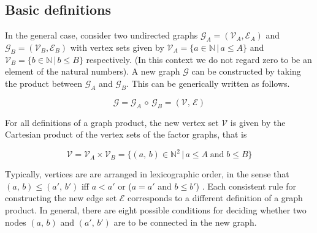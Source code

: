 \subsection{Basic definitions}

\label{sec:graph_products_defined}

In the general case, consider two undirected graphs $\mathcal{G}_A = (\mathcal{V}_A, \mathcal{E}_A)$ and $\mathcal{G}_B = (\mathcal{V}_B, \mathcal{E}_B)$ with vertex sets given by $\mathcal{V}_A = \{a \in \mathbb{N} \, | \, a \leq A \}$ and $\mathcal{V}_B = \{b \in \mathbb{N} \, | \, b \leq B \}$ respectively. (In this context we do not regard zero to be an element of the natural numbers). A new graph $\mathcal{G}$ can be constructed by taking the product between $\mathcal{G}_A$ and $\mathcal{G}_B$. This can be generically written as follows.

\begin{equation}
    \mathcal{G} = \mathcal{G}_A \, \diamond \, \mathcal{G}_B = (\mathcal{V}, \, \mathcal{E})
\end{equation}

For all definitions of a graph product, the new vertex set $\mathcal{V}$ is given by the Cartesian product of the vertex sets of the factor graphs, that is

\begin{equation}
    \mathcal{V} = \mathcal{V}_A \times \mathcal{V}_B = \{(a, \, b) \in \mathbb{N}^2 \, | \, a \leq A \; \text{and} \; b \leq B \}
\end{equation}


Typically, vertices are are arranged in lexicographic order, in the sense that $(a, \, b) \leq (a',\, b')$ iff $a < a'$ or ($a = a'$ and $b \leq b'$) \citep{Harzheim2005}. Each consistent rule for constructing the new edge set $\mathcal{E}$ corresponds to a different definition of a graph product. In general, there are eight possible conditions for deciding whether two nodes $(a, \, b)$ and $(a',\,  b')$ are to be connected in the new graph.


